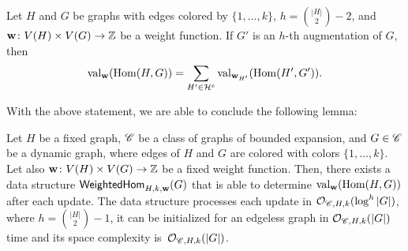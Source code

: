 \begin{lemma} \label{lem:weighted-hom-proj}
	Let $H$ and $G$ be graphs with edges colored by $\{1, \ldots, k\}$, $h = {|H| \choose 2} - 2$, and $\mathbf{w} \colon V(H) \times V(G) \to \mathbb{Z}$ be a weight function. If $G'$ is an $h$-th augmentation of $G$, then \[\mathrm{val}_{\mathbf{w}}(\mathrm{Hom}(H, G)) = \sum_{H' \in \mathcal{H}^e} \mathrm{val}_{\mathbf{w}_{H'}}(\mathrm{Hom}(H', G')).\]
\end{lemma}

With the above statement, we are able to conclude the following lemma:

\begin{lemma} \label{lem:weighted-hom}
	Let $H$ be a fixed graph, $\mathscr C$ be a class of graphs of bounded expansion, and $G \in \mathscr C$ be a dynamic graph, where edges of $H$ and $G$ are colored with colors $\{1, \ldots, k\}$. Let also $\mathbf{w} \colon V(H) \times V(G) \to \mathbb{Z}$ be a fixed weight function. Then, there exists a data structure $\mathsf{WeightedHom}_{H, k, \mathbf{w}}(G)$ that is able to determine $\mathrm{val}_{\mathbf{w}}(\mathrm{Hom}(H, G))$ after each update. %
	The data structure processes each update in $\mathcal{O}_{\mathscr C, H, k}(\log^h |G|)$,  where $h = {|H| \choose 2} - 1$, it can be initialized for an edgeless graph in $\mathcal{O}_{\mathscr C, H, k}(|G|)$ time and its space complexity is~$\mathcal{O}_{\mathscr C, H, k}(|G|)$.%
\end{lemma}

